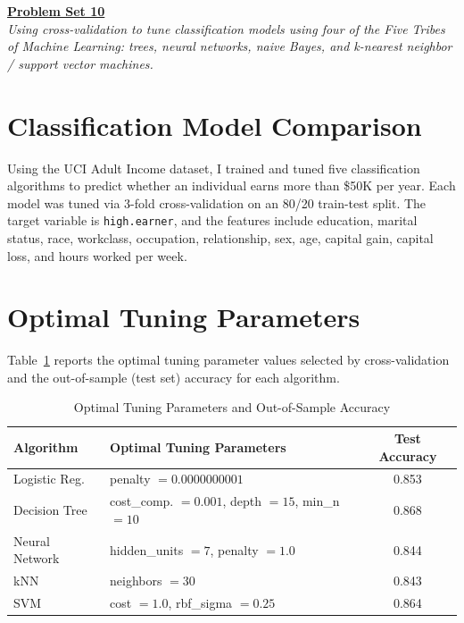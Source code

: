 \documentclass[12pt]{article}
\begin{document}
\begin{center}
\textbf{\underline{Problem Set 10}}\\
\textit{{Using cross-validation to tune classification models using four of the Five Tribes of Machine Learning: trees, neural networks, naive Bayes, and k-nearest neighbor / support vector machines.}}
\end{center}

\section*{Classification Model Comparison}

Using the UCI Adult Income dataset, I trained and tuned five classification algorithms to predict whether an individual earns more than \$50K per year. Each model was tuned via 3-fold cross-validation on an 80/20 train-test split. The target variable is \texttt{high.earner}, and the features include education, marital status, race, workclass, occupation, relationship, sex, age, capital gain, capital loss, and hours worked per week.

\section*{Optimal Tuning Parameters}

Table~\ref{tab:results} reports the optimal tuning parameter values selected by cross-validation and the out-of-sample (test set) accuracy for each algorithm.

\begin{table}[h]
\centering
\caption{Optimal Tuning Parameters and Out-of-Sample Accuracy}
\label{tab:results}
\small
\begin{tabular}{llc}
\toprule
Algorithm & Optimal Tuning Parameters & Test Accuracy \\
\midrule
Logistic Reg. & penalty $= 0.0000000001$ & 0.853 \\
Decision Tree & cost\_comp. $= 0.001$, depth $= 15$, min\_n $= 10$ & 0.868 \\
Neural Network & hidden\_units $= 7$, penalty $= 1.0$ & 0.844 \\
kNN & neighbors $= 30$ & 0.843 \\
SVM & cost $= 1.0$, rbf\_sigma $= 0.25$ & 0.864 \\
\bottomrule
\end{tabular}
\end{table}

\vspace{-1em}
\end{document}
